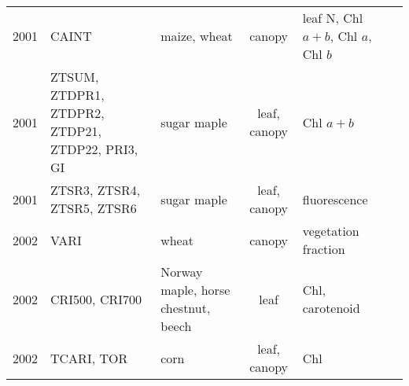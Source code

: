 \documentclass[10pt]{article}
\begin{document}
{\begin{ThreePartTable}
\begin{longtable}{c M{1.5in} M{2.5in} c M{1.5in} M{1.5in}}
  2001 & CAINT                                           & maize, wheat                                                                                                                                                                                                                                          & canopy       & leaf N, Chl $a+b$, Chl $a$, Chl $b$                                                      & \citet{Oppelt2001,Oppelt2004}                       \\
  2001 & ZTSUM, ZTDPR1, ZTDPR2, ZTDP21, ZTDP22, PRI3, GI & sugar maple                                                                                                                                                                                                                                           & leaf, canopy & Chl $a+b$                                                                                & \citet{Zarco-Tejada2001b}                           \\
  2001 & ZTSR3, ZTSR4, ZTSR5, ZTSR6                      & sugar maple                                                                                                                                                                                                                                           & leaf, canopy & fluorescence                                                                             & \citet{Zarco-Tejada2001a}                           \\
  2002 & VARI                                            & wheat                                                                                                                                                                                                                                                 & canopy       & vegetation fraction                                                                      & \citet{Gitelson2002b}                               \\
  2002 & CRI500, CRI700                                  & Norway maple, horse chestnut, beech                                                                                                                                                                                                                   & leaf         & Chl, carotenoid                                                                          & \citet{Gitelson2002a}                               \\
  2002 & TCARI, TOR                                      & corn                                                                                                                                                                                                                                                  & leaf, canopy & Chl                                                                                      & \citet{Haboudane2002}                               \\

\end{longtable}
\end{ThreePartTable}}
\end{document}
